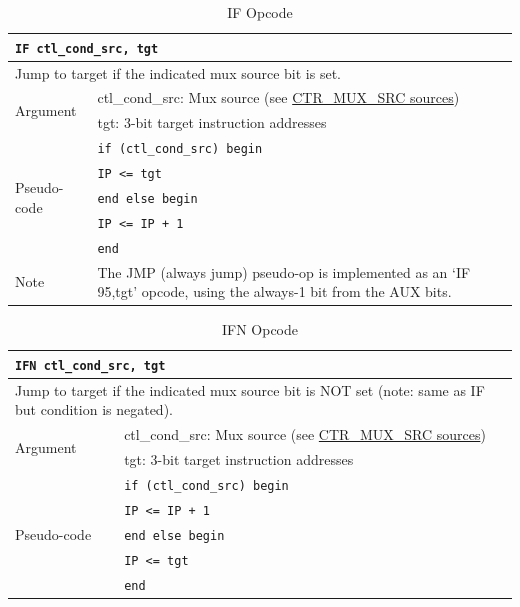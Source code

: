 \documentclass[main\_\_EN.tex]{subfiles}
\begin{document}
\begin{table}[H]
\caption{IF Opcode}
\label{tab:bitscrm-if-opcode}
\begin{tabular}{|l|p{14cm}|}
\hline
\multicolumn{2}{|l|}{\texttt{IF ctl\_cond\_src, tgt}} \\
\hline
\multicolumn{2}{|L{17cm}|}{Jump to target if the indicated mux source bit is set.} \\
\hline
\multirow{2}{*}{Argument} & ctl\_cond\_src: Mux source (see \hyperref[tab:bitscrm-ctrmuxsrc]{CTR\_MUX\_SRC sources}) \\
& tgt: 3-bit target instruction addresses  \\
\hline
\multirow{5}{*}{Pseudo-code} & \texttt{if (ctl\_cond\_src) begin} \\
& \hspace*{4mm} \texttt{IP <= tgt} \\
& \texttt{end else begin} \\
& \hspace*{4mm} \texttt{IP <= IP + 1} \\
& \texttt{end} \\
\hline
Note & The JMP (always jump) pseudo-op is implemented as an ‘IF 95,tgt’ opcode, using the always-1 bit from the AUX bits. \\
\hline
\end{tabular}
\end{table}

\begin{table}[H]
\caption{IFN Opcode}
\label{tab:bitscrm-ifn-opcode}
\begin{tabular}{|l|l|}
\hline
\multicolumn{2}{|l|}{\texttt{IFN ctl\_cond\_src, tgt}} \\
\hline
\multicolumn{2}{|L{17cm}|}{Jump to target if the indicated mux source bit is NOT set (note: same as IF but condition is negated).} \\
\hline
\multirow{2}{*}{Argument} & ctl\_cond\_src: Mux source (see \hyperref[tab:bitscrm-ctrmuxsrc]{CTR\_MUX\_SRC sources}) \\
& tgt: 3-bit target instruction addresses \\
\hline
\multirow{5}{*}{Pseudo-code} & \texttt{if (ctl\_cond\_src) begin} \\
& \hspace*{4mm} \texttt{IP <= IP + 1} \\
& \texttt{end else begin} \\
& \hspace*{4mm} \texttt{IP <= tgt} \\
& \texttt{end} \\
\hline
\end{tabular}
\end{table}
\end{document}
